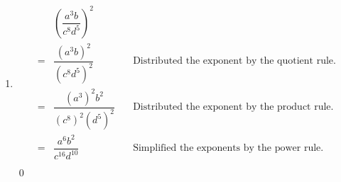 \begin{ex}
\begin{enumerate}
\item \[
\begin{array}{cll}
& \left( \dfrac{a^3 b}{c^8 d^5} \right)^2 & \\[8pt]
= & \dfrac{(a^3 b)^2}{(c^8 d^5)^2} & \quad\text{Distributed the exponent by the quotient rule.}\\[8pt]
= & \dfrac{(a^3)^2 b^2}{(c^8)^2 (d^5)^2} & \quad\text{Distributed the exponent by the product rule.}\\[8pt]
= & \dfrac{a^6 b^2}{c^{16} d^{10}} & \quad\text{Simplified the exponents by the power rule.}\\
\end{array}
\]
\vspace{-.3in} \qed
\end{enumerate}
\end{ex}


\medskip

